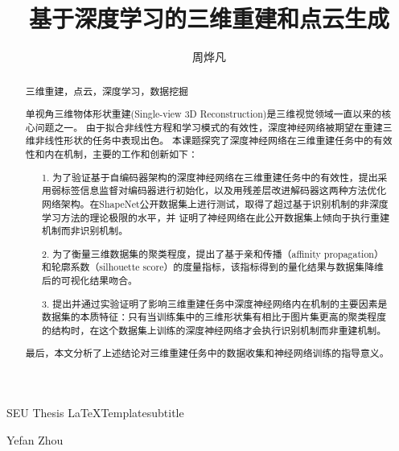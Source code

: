 \documentclass[bachelor, nocolorlinks, printoneside]{seuthesis} %
\begin{document}

\title{基于深度学习的三维重建和点云生成}{}{SEU Thesis \LaTeX Template}{subtitle}
\author{周烨凡}{Yefan Zhou}




\maketitle

\begin{abstract}{三维重建，点云，深度学习，数据挖掘}

    单视角三维物体形状重建(Single-view 3D Reconstruction)是三维视觉领域一直以来的核心问题之一。
    由于拟合非线性方程和学习模式的有效性，深度神经网络被期望在重建三维非线性形状的任务中表现出色。
    本课题探究了深度神经网络在三维重建任务中的有效性和内在机制，主要的工作和创新如下：
        
        \begin{enumerate}
            \item[1.] 为了验证基于自编码器架构的深度神经网络在三维重建任务中的有效性，提出采用弱标签信息监督对编码器进行初始化，以及用残差层改进解码器这两种方法优化网络架构。在ShapeNet公开数据集上进行测试，取得了超过基于识别机制的非深度学习方法的理论极限的水平，并
            证明了神经网络在此公开数据集上倾向于执行重建机制而非识别机制。 
            \item[2.] 为了衡量三维数据集的聚类程度，提出了基于亲和传播（affinity propagation）和轮廓系数（silhouette score）的度量指标，该指标得到的量化结果与数据集降维后的可视化结果吻合。
            \item[3.] 提出并通过实验证明了影响三维重建任务中深度神经网络内在机制的主要因素是数据集的本质特征：只有当训练集中的三维形状集有相比于图片集更高的聚类程度的结构时，在这个数据集上训练的深度神经网络才会执行识别机制而非重建机制。
        \end{enumerate}
    最后，本文分析了上述结论对三维重建任务中的数据收集和神经网络训练的指导意义。
    \end{abstract}
\end{document}
